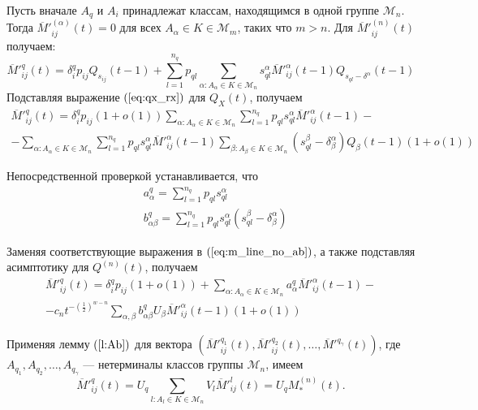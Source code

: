 \documentclass[12pt]{article}
\begin{document}
{Пусть вначале $A_q$ и $A_i$ принадлежат классам, находящимся в одной группе $\mathcal{M}_n$. Тогда $\overline{M}'^{(\alpha)}_{ij}(t) = 0$ для всех $A_\alpha \in K \in \mathcal{M}_m$, таких что $m > n$. Для $\overline{M}'^{(n)}_{ij}(t)$ получаем:
\begin{equation*}
	\overline{M}'^q_{ij}(t) = \delta^q_i p_{ij} Q_{s_{ij}}(t - 1) + \sum_{l = 1}^{n_q} p_{ql} \sum_{\alpha : A_\alpha \in K \in \mathcal{M}_n} s_{ql}^\alpha \overline{M}'^\alpha_{ij}(t - 1) Q_{s_{ql} - \delta^\alpha}(t-1)
\end{equation*}
Подставляя выражение $(\ref{eq:qx_rx})$ для $Q_X(t)$, получаем
\begin{multline}
\label{eq:m_line_no_ab}
	\overline{M}'^q_{ij}(t) = \delta^q_i p_{ij} (1 + o(1)) \sum_{\alpha : A_\alpha \in K \in \mathcal{M}_n} \sum_{l = 1}^{n_q} p_{ql} s_{ql}^\alpha \overline{M}'^\alpha_{ij}(t-1) - \\
	- \sum_{\alpha : A_{\alpha} \in K \in \mathcal{M}_n} \sum_{l = 1}^{n_q} p_{ql} s_{ql}^\alpha \overline{M}'^\alpha_{ij}(t-1) \sum_{\beta : A_\beta \in K \in \mathcal{M}_n} (s_{ql}^\beta - \delta^\alpha_\beta) Q_\beta(t-1) (1 + o(1))
\end{multline}

Непосредственной проверкой устанавливается, что
\begin{equation}
\label{eq:ab}
	\begin{split}
		&a^q_\alpha = \sum_{l = 1}^{n_q} p_{ql} s_{ql}^\alpha \\
		&b^q_{\alpha \beta} = \sum_{l = 1}^{n_q} p_{ql} s_{ql}^\alpha (s_{ql}^\beta - \delta^\alpha_\beta)
	\end{split}
\end{equation}

Заменяя соответствующие выражения в $(\ref{eq:m_line_no_ab})$, а также подставляя асимптотику для $Q^{(n)}(t)$, получаем
\begin{multline}
\label{eq:m_line_ab}
	\overline{M}'^q_{ij}(t) = \delta^q_i p_{ij} (1 + o(1)) + \sum_{\alpha : A_\alpha \in K \in \mathcal{M}_n} a^q_\alpha \overline{M}'^\alpha_{ij}(t-1) - \\
	- c_n t^{-\left(\frac{1}{2}\right)^{w-n}} \sum_{\alpha,\beta} b^q_{\alpha \beta} U_\beta \overline{M}'^\alpha_{ij}(t-1) (1 + o(1))
\end{multline}

Применяя лемму $(\ref{l:Ab})$ для вектора $(\overline{M}'^{q_1}_{ij}(t), \overline{M}'^{q_2}_{ij}(t), \ldots, \overline{M}'^{q_\gamma}(t))$, где $A_{q_1}, A_{q_2}, \ldots, A_{q_\gamma}$ --- нетерминалы классов группы $\mathcal{M}_n$, имеем
\begin{equation*}
\label{eq:muv}
	\overline{M}'^q_{ij}(t) = U_q \sum_{l : A_l \in K \in \mathcal{M}_n} V_l \overline{M}'^l_{ij}(t) = U_q M^{(n)}_*(t).
\end{equation*}

}
\end{document}
